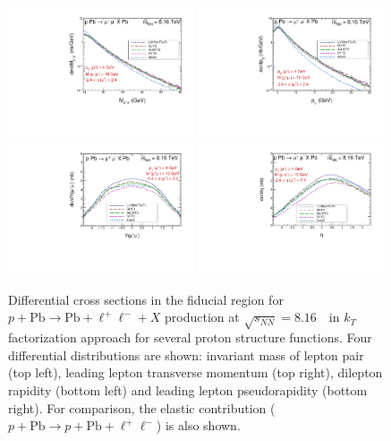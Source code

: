 \begin{figure}[!h]
 \includegraphics[width=0.49\textwidth]{figures_Marta/Mll-l.pdf}
  \includegraphics[width=0.49\textwidth]{figures_Marta/pt1-l.pdf}
 \includegraphics[width=0.49\textwidth]{figures_Marta/Y-l.pdf}
  \includegraphics[width=0.49\textwidth]{figures_Marta/y1-l.pdf}
\caption{Differential cross sections in the fiducial region for $p+\textrm{Pb}\rightarrow \textrm{Pb} + \ell^+\ell^- + X$ production at $\sqrt{s_{N N}} = 8.16$~\TeV\ in $k_T$ factorization approach for several proton structure functions.
Four differential distributions are shown: invariant mass of lepton pair (top left), leading lepton transverse momentum (top right),
dilepton rapidity (bottom left) and leading lepton pseudorapidity (bottom right).
For comparison, the elastic contribution ($p+\textrm{Pb}\rightarrow p+ \textrm{Pb} + \ell^+\ell^-$) is also shown.
}
 \label{fig:kt_figures1}
\end{figure}


